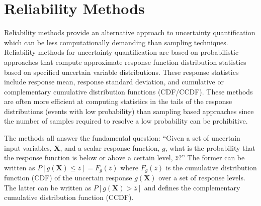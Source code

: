 \section{Reliability Methods}\label{uq:reliability}

Reliability methods provide an alternative approach to uncertainty
quantification which can be less computationally demanding than
sampling techniques.  Reliability methods for uncertainty
quantification are based on probabilistic approaches that compute
approximate response function distribution statistics based on
specified uncertain variable distributions.  These response statistics
include response mean, response standard deviation, and cumulative or
complementary cumulative distribution functions (CDF/CCDF).  These
methods are often more efficient at computing statistics in the tails
of the response distributions (events with low probability) than
sampling based approaches since the number of samples required to
resolve a low probability can be prohibitive.

The methods all answer the fundamental question: ``Given a set of
uncertain input variables, $\mathbf{X}$, and a scalar response
function, $g$, what is the probability that the response function is
below or above a certain level, $\bar{z}$?'' The former can be written
as $P[g(\mathbf{X}) \le \bar{z}] = \mathit{F}_{g}(\bar{z})$ where
$\mathit{F}_{g}(\bar{z})$ is the cumulative distribution function
(CDF) of the uncertain response $g(\mathbf{X})$ over a set of response
levels.  The latter can be written as $P[g(\mathbf{X}) > \bar{z}]$ and
defines the complementary cumulative distribution function (CCDF).

